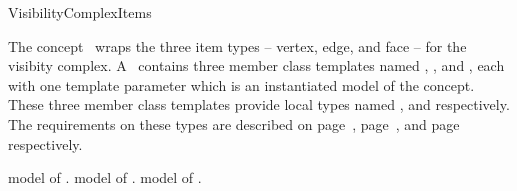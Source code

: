 
\ccRefPageBegin

\begin{ccRefConcept}{VisibilityComplexItems}
\label{pageVisibilityComplexItemsRef}

\ccDefinition
  
The concept \ccRefName\ wraps the three item types -- vertex, edge, and face --
for the visibity complex.  A \ccRefName\ contains three member class templates
named , , and , each
with one template parameter  which is an instantiated model of
the  concept. These three member class templates
provide local types named ,  and  respectively.
The requirements on these types are described on page~\pageref{pageVCVertexRef},
page~\pageref{pageVCEdgeRef}, and page~\pageref{pageVCFaceRef} respectively.

\ccTypes
{}

    {model of .}
\ccGlue
{}
    {model of .}
\ccGlue
{}
    {model of .}

\ccHasModels
{}

\ccSeeAlso


\end{ccRefConcept}
